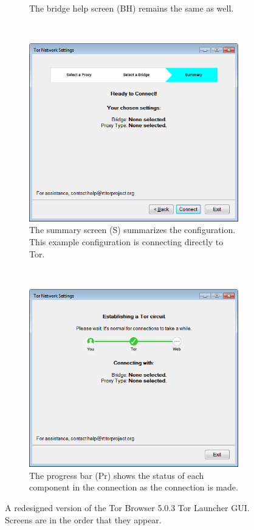 \documentclass[USenglish,oneside,twocolumn]{article}
\begin{document}
\begin{figure}
\begin{subfigure}[b]{0.30\textwidth}
	\centering\captionsetup{width=1.5\linewidth}%
	\caption{The bridge help screen (BH) remains the same as well.}
	\label{fig:new-bridge-help}
\end{subfigure}
~~~~~~~~~~
\begin{subfigure}[b]{0.30\textwidth}
	\includegraphics[width=\textwidth]{screenshots/NEW-summary.png}
	\centering\captionsetup{width=1.5\linewidth}%
	\caption{The summary screen (S) summarizes the configuration. This example configuration is connecting directly to Tor.}
	\label{fig:new-summary}
\end{subfigure}
~~~~~~~~~~~~~~~~~~~~~~~~~
\begin{subfigure}[b]{0.30\textwidth}
	\includegraphics[width=\textwidth]{screenshots/NEW-progress.png}
	\centering\captionsetup{width=1.5\linewidth}%
	\caption{The progress bar (Pr) shows the status of each component in the connection as the connection is made.}
	\label{fig:new-progress}
\end{subfigure}
\caption{
A redesigned version of the Tor Browser 5.0.3 Tor Launcher GUI. Screens are in the order that they appear. 
}
\label{fig:new-interface}
\end{figure} 
\end{document}
